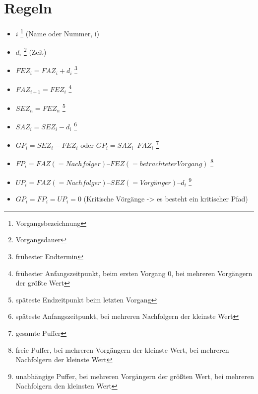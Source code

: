 \documentclass[a4paper,12pt]{scrartcl}
\begin{document}
\section{Regeln}
\begin{itemize}
\item $i$ \footnote{Vorgangsbezeichnung} (Name oder Nummer, i) 
\item $d_i$ \footnote{Vorgangsdauer} (Zeit)
\item $FEZ_i = FAZ_i + d_i$ \footnote{frühester Endtermin}
\item $FAZ_{i+1} = FEZ_i$ \footnote{frühester Anfangszeitpunkt, beim ersten Vorgang 0, bei mehreren Vorgängern der größte Wert}
\item $SEZ_n = FEZ_n$ \footnote{späteste Endzeitpunkt beim letzten Vorgang}
\item $SAZ_i = SEZ_i - d_i$ \footnote{späteste Anfangszeitpunkt, bei mehreren Nachfolgern der kleinste Wert}
\item $GP_i = SEZ_i - FEZ_i$ oder $GP_i = SAZ_i – FAZ_i$ \footnote{gesamte Puffer}
\item $FP_i = FAZ (= Nachfolger) – FEZ (= betrachteter Vorgang)$ \footnote{freie Puffer, bei mehreren Vorgängern der kleinste Wert, bei mehreren Nachfolgern der kleinste Wert}
\item $UP_i = FAZ (= Nachfolger) – SEZ (= Vorgänger) – d_i$ \footnote{unabhängige Puffer, bei mehreren Vorgängern der größten Wert, bei mehreren Nachfolgern den kleinsten Wert}
\item $GP_i = FP_i = UP_i = 0$ (Kritische Vörgänge -> es besteht ein kritischer Pfad)

\end{itemize}
\end{document}
